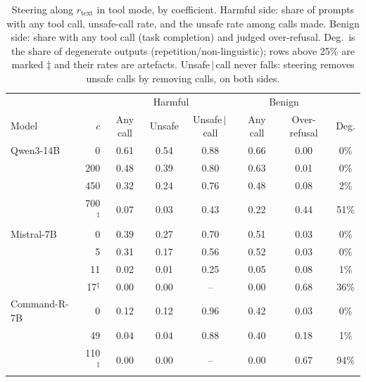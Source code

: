 \begin{table}[t]
\centering
\caption{Steering along $r_\text{text}$ in tool mode, by coefficient. Harmful side: share
of prompts with any tool call, unsafe-call rate, and the unsafe rate among calls made. Benign
side: share with any tool call (task completion) and judged over-refusal. Deg.\ is the share
of degenerate outputs (repetition/non-linguistic); rows above 25\% are marked $\ddagger$ and
their rates are artefacts. Unsafe\,$\mid$\,call never falls: steering removes unsafe calls
by removing calls, on both sides.}
\label{tab:steering-calls}
  \begin{tabular}{lr|ccc|cc|c}
\toprule
 & & \multicolumn{3}{c|}{Harmful} & \multicolumn{2}{c|}{Benign} & \\
Model & $c$ & Any call & Unsafe & Unsafe\,$\mid$\,call & Any call & Over-refusal & Deg. \\
\midrule
Qwen3-14B      & 0 & 0.61 & 0.54 & 0.88 & 0.66 & 0.00 & 0\% \\
               & 200 & 0.48 & 0.39 & 0.80 & 0.63 & 0.01 & 0\% \\
               & 450 & 0.32 & 0.24 & 0.76 & 0.48 & 0.08 & 2\% \\
               & 700$^\ddagger$ & 0.07 & 0.03 & 0.43 & 0.22 & 0.44 & 51\% \\
\midrule
Mistral-7B     & 0 & 0.39 & 0.27 & 0.70 & 0.51 & 0.03 & 0\% \\
               & 5 & 0.31 & 0.17 & 0.56 & 0.52 & 0.03 & 0\% \\
               & 11 & 0.02 & 0.01 & 0.25 & 0.05 & 0.08 & 1\% \\
               & 17$^\ddagger$ & 0.00 & 0.00 & -- & 0.00 & 0.68 & 36\% \\
\midrule
Command-R-7B   & 0 & 0.12 & 0.12 & 0.96 & 0.42 & 0.03 & 0\% \\
               & 49 & 0.04 & 0.04 & 0.88 & 0.40 & 0.18 & 1\% \\
               & 110$^\ddagger$ & 0.00 & 0.00 & -- & 0.00 & 0.67 & 94\% \\

\end{tabular}
\end{table}
